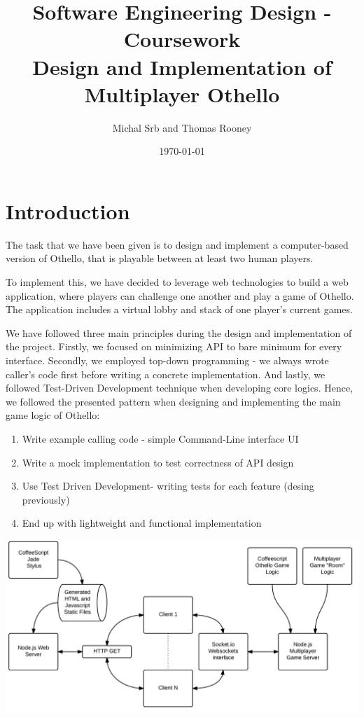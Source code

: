 \documentclass[a4wide, 11pt]{article}
\begin{document}
\title{Software Engineering Design - Coursework \\ Design and Implementation of Multiplayer Othello}

\author{Michal Srb and Thomas Rooney}

\date{\today}         %

\maketitle            %

\section{Introduction}

The task that we have been given is to design and implement a computer-based version of Othello, that is playable between at least two human players.

To implement this, we have decided to leverage web technologies to build a web application, where players can challenge one another and play a game of Othello. The application includes a virtual lobby and stack of one player's current games.

We have followed three main principles during the design and implementation of the project. Firstly, we focused on minimizing API to bare minimum for every interface. Secondly, we employed top-down programming - we always wrote caller's code first before writing a concrete implementation. And lastly, we followed Test-Driven Development technique when developing core logics. Hence, we followed the presented pattern when designing and implementing the main game logic of Othello:
\begin{enumerate}
\item Write example calling code - simple Command-Line interface UI
\item Write a mock implementation to test correctness of API design
\item Use Test Driven Development- writing tests for each feature (desing previously)
\item End up with lightweight and functional implementation
\end{enumerate}

\includegraphics[width=\textwidth]{SoftwareEngineering.png}
\end{document}
